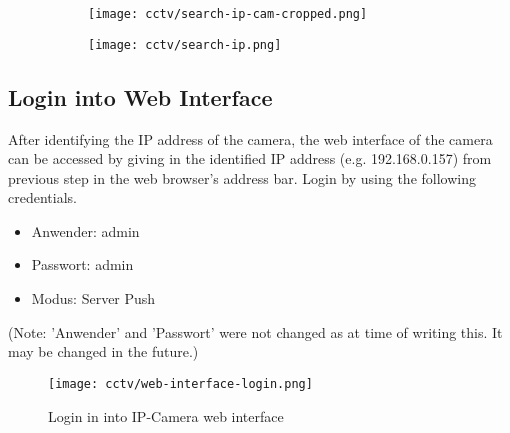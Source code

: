 \begin{figure}[ht]
\caption{SearchIPCam.exe}
\label{search-ip-cam-exe}
\centering
	\begin{subfigure}{.49\linewidth}
	\texttt{[image: cctv/search-ip-cam-cropped.png]}
	\end{subfigure}
	\begin{subfigure}{.49\textwidth}
	\texttt{[image: cctv/search-ip.png]}
	\end{subfigure}
\end{figure}

\subsection{Login into Web Interface}
After identifying the IP address of the camera, the web interface of the camera can be accessed by giving in the identified IP address (e.g. 192.168.0.157) from previous step in the web browser's address bar. Login by using the following credentials.
\begin{itemize}
\item Anwender: admin
\item Passwort: admin
\item Modus: Server Push
\end{itemize}
(Note: 'Anwender' and 'Passwort' were not changed as at time of writing this. It may be changed in the future.)

\begin{figure}[ht]
\caption{Login in into IP-Camera web interface}
\label{ip-camera-web-interface}
\centering
\texttt{[image: cctv/web-interface-login.png]}
\end{figure}

